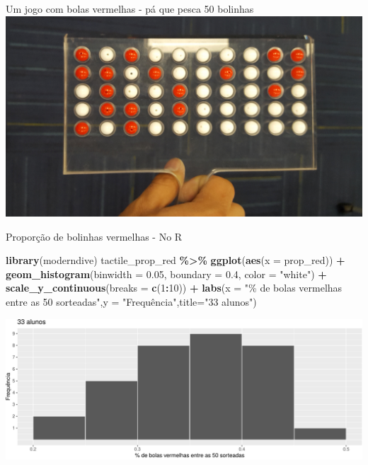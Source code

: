 \documentclass[
  9pt,
  ignorenonframetext,
  aspectratio=169]{beamer}
\newenvironment{Shaded}{\begin{snugshade}}{\end{snugshade}}
\newcommand{\DataTypeTok}[1]{\textcolor[rgb]{0.13,0.29,0.53}{#1}}
\newcommand{\DecValTok}[1]{\textcolor[rgb]{0.00,0.00,0.81}{#1}}
\newcommand{\FloatTok}[1]{\textcolor[rgb]{0.00,0.00,0.81}{#1}}
\newcommand{\KeywordTok}[1]{\textcolor[rgb]{0.13,0.29,0.53}{\textbf{#1}}}
\newcommand{\NormalTok}[1]{#1}
\newcommand{\OperatorTok}[1]{\textcolor[rgb]{0.81,0.36,0.00}{\textbf{#1}}}
\newcommand{\StringTok}[1]{\textcolor[rgb]{0.31,0.60,0.02}{#1}}
\begin{document}
\begin{frame}{Um jogo com bolas vermelhas - pá que pesca 50 bolinhas}
\protect\hypertarget{um-jogo-com-bolas-vermelhas---puxe1-que-pesca-50-bolinhas}{}
\includegraphics{imgs/sampling_bowl_3_cropped.jpg}
\end{frame}

\begin{frame}[fragile]{Proporção de bolinhas vermelhas - No R}
\protect\hypertarget{proporuxe7uxe3o-de-bolinhas-vermelhas---no-r}{}
\begin{Shaded}
\begin{Highlighting}[]
\KeywordTok{library}\NormalTok{(moderndive)}
\NormalTok{tactile\_prop\_red }\OperatorTok{\%\textgreater{}\%}\StringTok{ }\KeywordTok{ggplot}\NormalTok{(}\KeywordTok{aes}\NormalTok{(}\DataTypeTok{x =}\NormalTok{ prop\_red)) }\OperatorTok{+}
\StringTok{  }\KeywordTok{geom\_histogram}\NormalTok{(}\DataTypeTok{binwidth =} \FloatTok{0.05}\NormalTok{, }\DataTypeTok{boundary =} \FloatTok{0.4}\NormalTok{, }\DataTypeTok{color =} \StringTok{"white"}\NormalTok{) }\OperatorTok{+}
\StringTok{  }\KeywordTok{scale\_y\_continuous}\NormalTok{(}\DataTypeTok{breaks =} \KeywordTok{c}\NormalTok{(}\DecValTok{1}\OperatorTok{:}\DecValTok{10}\NormalTok{)) }\OperatorTok{+}
\StringTok{  }\KeywordTok{labs}\NormalTok{(}\DataTypeTok{x =} \StringTok{"\% de bolas vermelhas entre as 50 sorteadas"}\NormalTok{,}\DataTypeTok{y =} \StringTok{"Frequência"}\NormalTok{,}\DataTypeTok{title=}\StringTok{"33 alunos"}\NormalTok{) }
\end{Highlighting}
\end{Shaded}

\includegraphics{aula_09_files/figure-beamer/unnamed-chunk-5-1.pdf}
\end{frame}
\end{document}
